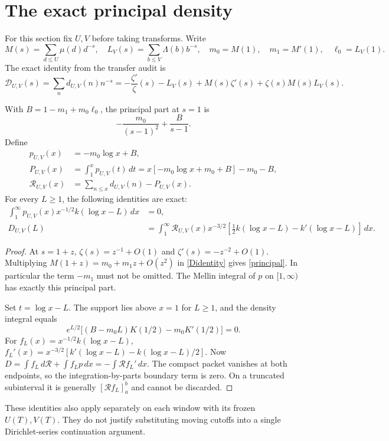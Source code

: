 \documentclass[11pt]{article}
\newcommand{\dd}{\,d}\newcommand{\E}{\mathcal E}\newcommand{\C}{\mathcal C}
\newcommand{\R}{\mathcal R}\newcommand{\D}{\mathcal D}
\begin{document}
\section{The exact principal density}
For this section fix $U,V$ before taking transforms. Write
\[
 M(s)=\sum_{d\le U}\mu(d)d^{-s},\quad
 L_V(s)=\sum_{b\le V}\Lambda(b)b^{-s},\quad
 m_0=M(1),\quad m_1=M'(1),\quad \ell_0=L_V(1).
\]
The exact identity from the transfer audit is
\begin{equation}\label{Didentity}
 \D_{U,V}(s)=\sum_n d_{U,V}(n)n^{-s}
 =-\frac{\zeta'}\zeta(s)-L_V(s)+M(s)\zeta'(s)
       +\zeta(s)M(s)L_V(s).
\end{equation}

\begin{proposition}\label{center}
With $B=1-m_1+m_0\ell_0$, the principal part at $s=1$ is
\begin{equation}\label{principal}
 -\frac{m_0}{(s-1)^2}+\frac{B}{s-1}.
\end{equation}
Define
\begin{align*}
 p_{U,V}(x)&=-m_0\log x+B,\\
 P_{U,V}(x)&=\int_1^xp_{U,V}(t)\dd t
 =x[-m_0\log x+m_0+B]-m_0-B,\\
 \R_{U,V}(x)&=\sum_{n\le x}d_{U,V}(n)-P_{U,V}(x).
\end{align*}
For every $L\ge1$, the following identities are exact:
\begin{align}
 \int_1^\infty p_{U,V}(x)x^{-1/2}k(\log x-L)\dd x&=0,\label{densityzero}\\
 D_{U,V}(L)&=\int_1^\infty\R_{U,V}(x)x^{-3/2}
       [\tfrac12 k(\log x-L)-k'(\log x-L)]\dd x.\label{Stieltjes}
\end{align}
\end{proposition}
\begin{proof}
At $s=1+z$, $\zeta(s)=z^{-1}+O(1)$ and
$\zeta'(s)=-z^{-2}+O(1)$. Multiplying $M(1+z)=m_0+m_1z+O(z^2)$
in \eqref{Didentity} gives \eqref{principal}. In particular the term
$-m_1$ must not be omitted. The Mellin integral of $p$ on $[1,\infty)$
has exactly this principal part.

Set $t=\log x-L$. The support lies above $x=1$ for $L\ge1$,
and the density integral equals
\[
 e^{L/2}\bigl[(B-m_0L)K(1/2)-m_0K'(1/2)\bigr]=0.
\]
For $f_L(x)=x^{-1/2}k(\log x-L)$,
$f_L'(x)=x^{-3/2}[k'(\log x-L)-k(\log x-L)/2]$.
Now $D=\int f_L\dd\R+\int f_Lp\dd x=-\int\R f_L'\dd x$.
The compact packet vanishes at both endpoints, so the integration-by-parts
boundary term is zero. On a truncated subinterval it is generally
$[\R f_L]_a^b$ and cannot be discarded.
\end{proof}
These identities also apply separately on each window with its frozen
$U(T),V(T)$. They do not justify substituting moving cutoffs into a
single Dirichlet-series continuation argument.
\end{document}
